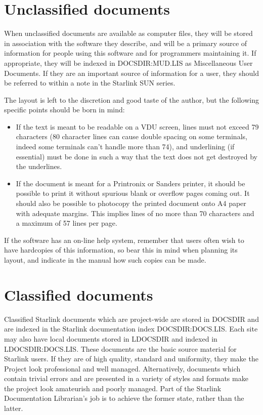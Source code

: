 \section{Unclassified documents}

When unclassified documents are available as computer files, they will be
stored in association with the software they describe, and will be a primary
source of information for people using this software and for programmers
maintaining it.
If appropriate, they will be indexed in DOCSDIR:MUD.LIS as Miscellaneous
User Documents.
If they are an important source of information for a user, they should be
referred to within a note in the Starlink SUN series.

The layout is left to the discretion and good taste of the author, but the
following specific points should be born in mind:
\begin{itemize}
\item If the text is meant to be readable on a VDU screen, lines must not
exceed 79 characters (80 character lines can cause double spacing on some
terminals, indeed some terminals can't handle more than 74), and underlining
(if essential) must be done in such a way that the text does not get destroyed
by the underlines.
\item If the document is meant for a Printronix or Sanders printer, it should
be possible to print it without spurious blank or overflow pages coming out.
It should also be possible to photocopy the printed document onto A4 paper with
adequate margins.
This implies lines of no more than 70 characters and a maximum of 57 lines per
page.
\end{itemize}

If the software has an on-line help system, remember that users often wish to
have hardcopies of this information, so bear this in mind when planning its
layout, and indicate in the manual how such copies can be made.

\section{Classified documents}

Classified Starlink documents which are project-wide are stored in DOCSDIR and
are indexed in the Starlink documentation index DOCSDIR:DOCS.LIS.
Each site may also have local documents stored in LDOCSDIR and indexed in
LDOCSDIR:DOCS.LIS.
These documents are the basic source material for Starlink users.
If they are of high quality, standard and uniformity, they make the Project
look professional and well managed.
Alternatively, documents which contain trivial errors and are presented in a
variety of styles and formats make the project look amateurish and poorly
managed.
Part of the Starlink Documentation Librarian's job is to achieve the former
state, rather than the latter.

